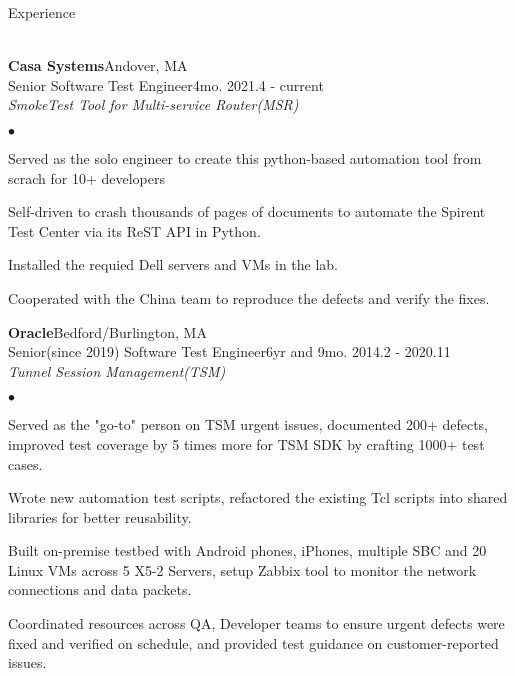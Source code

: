 \documentclass[10pt]{article}
\newcommand{\lineunder}{\vspace*{-8pt}\\\hspace*{-18pt}\hrulefill\\}
\newcommand{\header}[1]{{\hspace*{-15pt}\vspace*{6pt}\large{{#1}}}\vspace*{-6pt}\lineunder}
\newcommand{\company}[5]{
    \large{\textbf{#1}}\hfill \small{#3}\\
    #2\hfill \small{#4}\small{#5}\\
}
\newcommand{\project}[1]{\checkmark\normalsize{{\emph{#1}}}\\}
\newenvironment{achievements}
    {\begin{list}
        {$\bullet$}{\topsep 0pt \itemsep -1pt}} 
    {\end{list}}
\begin{document}
\header{Experience}


\vspace*{10pt}
\company{Casa Systems}{Senior Software Test Engineer}{Andover, MA}{4mo. }{2021.4 - current}
\project{SmokeTest Tool for Multi-service Router(MSR)}
 \begin{achievements}
\item Served as the solo engineer to create this python-based automation tool from scrach for 10+ developers
\item Self-driven to crash thousands of pages of documents to automate the Spirent Test Center via its ReST API in Python.
\item Installed the requied Dell servers and VMs in the lab.
\item Cooperated with the China team to reproduce the defects and verify the fixes.
 \end{achievements}

\vspace*{5pt}

\company{Oracle}{Senior(since 2019) Software Test Engineer}{Bedford/Burlington, MA}{6yr and 9mo. }{2014.2 - 2020.11}

\project{Tunnel Session Management(TSM)}
  \begin{achievements}
\item Served as the "go-to" person on TSM urgent issues, documented 200+ defects, improved test coverage by 5 times more for TSM SDK by crafting 1000+ test cases. 
\item Wrote new automation test scripts, refactored the existing Tcl scripts into shared libraries for better reusability.
\item Built on-premise testbed with Android phones, iPhones, multiple SBC and 20 Linux VMs across 5 X5-2 Servers, setup Zabbix tool to monitor the network connections and data packets.
\item Coordinated resources across QA, Developer teams to ensure urgent defects were fixed and verified on schedule, and provided test guidance on customer-reported issues.
  \end{achievements}
\end{document}
